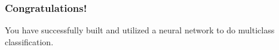 \documentclass[11pt]{article}
\makeatletter
\newcommand{\boxspacing}{\kern\kvtcb@left@rule\kern\kvtcb@boxsep}
\newcommand{\prompt}[4]{
        \ttfamily\llap{{\color{#2}[#3]:\hspace{3pt}#4}}\vspace{-\baselineskip}
    }
\makeatother
\begin{document}
    \hypertarget{congratulations}{%
\subsubsection{Congratulations!}\label{congratulations}}

You have successfully built and utilized a neural network to do
multiclass classification.

    \begin{tcolorbox}[breakable, size=fbox, boxrule=1pt, pad at break*=1mm,colback=cellbackground, colframe=cellborder]
\prompt{In}{incolor}{ }{\boxspacing}
\begin{Verbatim}[commandchars=\\\{\}]

\end{Verbatim}
\end{tcolorbox}


    
    
    
\end{document}
